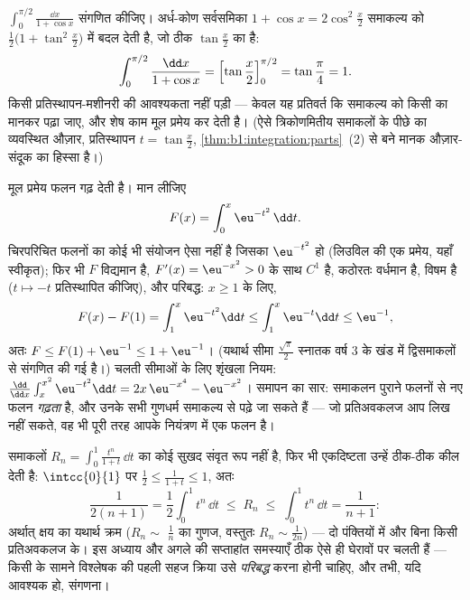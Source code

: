 \begin{example}\label{ex:b1:integration:halfangle}
$\displaystyle\int_0^{\pi/2} \frac{\dd x}{1 + \cos x}$ संगणित कीजिए।
अर्ध-कोण सर्वसमिका $1 + \cos x = 2\cos^2\frac x2$ समाकल्य को
$\frac{1}{2}\bigl(1 + \tan^2\frac x2\bigr)$ में बदल देती है, जो ठीक
$\tan\frac x2$ का  है:
\[
\int_0^{\pi/2} \frac{\dd x}{1 + \cos x}
= \Bigl[\tan\frac x2\Bigr]_0^{\pi/2} = \tan\frac\pi4 = 1 .
\]
किसी प्रतिस्थापन-मशीनरी की आवश्यकता नहीं पड़ी --- केवल यह प्रतिवर्त कि
समाकल्य को किसी का  मानकर पढ़ा जाए, और शेष काम मूल प्रमेय कर देती है।
(ऐसे त्रिकोणमितीय समाकलों के पीछे का व्यवस्थित औज़ार, प्रतिस्थापन $t =
\tan\frac x2$, \cref{thm:b1:integration:parts}~(2) से बने मानक औज़ार-संदूक
का हिस्सा है।)
\end{example}

\begin{example}[समाकलों से परिभाषित फलन]\label{ex:b1:integration:definedby}
मूल प्रमेय फलन गढ़ देती है। मान लीजिए
\[
F(x) = \int_0^x \eu^{-t^2}\,\dd t .
\]
चिरपरिचित फलनों का कोई भी संयोजन ऐसा नहीं है जिसका  $\eu^{-t^2}$ हो
(लिउविल की एक प्रमेय, यहाँ स्वीकृत); फिर भी $F$ विद्यमान है, $F'(x) =
\eu^{-x^2} > 0$ के साथ $C^1$ है, कठोरतः वर्धमान है, विषम है ($t \mapsto -t$
प्रतिस्थापित कीजिए), और परिबद्ध: $x \geq 1$ के लिए,
\[
F(x) - F(1) = \int_1^x \eu^{-t^2}\dd t
\leq \int_1^x \eu^{-t}\dd t \leq \eu^{-1} ,
\]
अतः $F \leq F(1) + \eu^{-1} \leq 1 + \eu^{-1}$। (यथार्थ सीमा
$\frac{\sqrt\pi}{2}$ स्नातक वर्ष 3 के खंड में द्विसमाकलों से संगणित की गई
है।) चलती सीमाओं के लिए शृंखला नियम: $\frac{\dd}{\dd x}\int_x^{x^2}
\eu^{-t^2}\dd t = 2x\,\eu^{-x^4} - \eu^{-x^2}$। समापन का सार: समाकलन पुराने
फलनों से नए फलन \emph{गढ़ता} है, और उनके सभी गुणधर्म समाकल्य से पढ़े जा सकते
हैं --- जो प्रतिअवकलज आप लिख नहीं सकते, वह भी पूरी तरह आपके नियंत्रण में एक
फलन है।
\end{example}

\begin{example}[बिना मान निकाले आकलन]\label{ex:b1:integration:estimate}
समाकलों $R_n = \int_0^1 \frac{t^n}{1 + t}\,\dd t$ का कोई सुखद संवृत रूप नहीं
है, फिर भी एकदिष्टता उन्हें ठीक-ठीक कील देती है: $\intcc{0}{1}$ पर $\frac12
\leq \frac{1}{1+t} \leq 1$, अतः
\[
\frac{1}{2(n+1)} = \frac12\int_0^1 t^n\,\dd t
\;\leq\; R_n \;\leq\; \int_0^1 t^n \,\dd t = \frac{1}{n+1} :
\]
अर्थात् क्षय का यथार्थ क्रम ($R_n \sim$ $\frac1n$ का गुणज, वस्तुतः $R_n \sim
\frac{1}{2n}$) --- दो पंक्तियों में और बिना किसी प्रतिअवकलज के। इस अध्याय और
अगले की सप्ताहांत समस्याएँ ठीक ऐसे ही घेरावों पर चलती हैं --- किसी  के
सामने विश्लेषक की पहली सहज क्रिया उसे \emph{परिबद्ध} करना होनी चाहिए, और
तभी, यदि आवश्यक हो, संगणना।
\end{example}

